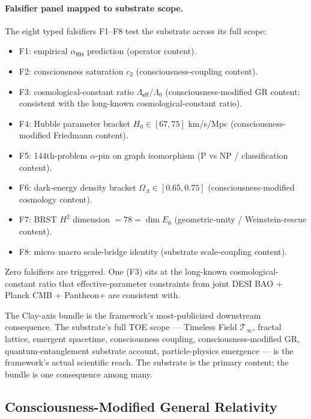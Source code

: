 \documentclass[11pt,a4paper]{amsart}
\theoremstyle{plain}
\theoremstyle{definition}
\begin{document}
\paragraph{Falsifier panel mapped to substrate scope.} The eight typed falsifiers F1--F8 test the substrate across its full scope:
\begin{itemize}[itemsep=1pt,leftmargin=2em]
\item F1: empirical $\alpha_{\textsf{RH}}$ prediction (operator content).
\item F2: consciousness saturation $c_2$ (consciousness-coupling content).
\item F3: cosmological-constant ratio $\Lambda_{\textsf{eff}}/\Lambda_0$ (consciousness-modified GR content; consistent with the long-known cosmological-constant ratio).
\item F4: Hubble parameter bracket $H_0 \in [67, 75]$ km/s/Mpc (consciousness-modified Friedmann content).
\item F5: 144th-problem $\alpha$-pin on graph isomorphism (P vs NP / classification content).
\item F6: dark-energy density bracket $\Omega_\Lambda \in [0.65, 0.75]$ (consciousness-modified cosmology content).
\item F7: BRST $H^2$ dimension $= 78 = \dim E_6$ (geometric-unity / Weinstein-rescue content).
\item F8: micro--macro scale-bridge identity (substrate scale-coupling content).
\end{itemize}
Zero falsifiers are triggered. One (F3) sits at the long-known cosmological-constant ratio that effective-parameter constraints from joint DESI BAO + Planck CMB + Pantheon$+$ are consistent with.

The Clay-axis bundle is the framework's most-publicized downstream consequence. The substrate's full TOE scope --- Timeless Field $\mathcal{T}_\infty$, fractal lattice, emergent spacetime, consciousness coupling, consciousness-modified GR, quantum-entanglement substrate account, particle-physics emergence --- is the framework's actual scientific reach. The substrate is the primary content; the bundle is one consequence among many.

\subsection{Consciousness-Modified General Relativity}\label{subsec:consciousness-modified-relativity}
\end{document}
